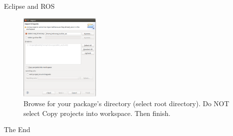\documentclass{beamer}
\begin{document}
\begin{frame}{Eclipse and ROS}

\begin{figure}
	\centering
  \includegraphics[width=0.35\textwidth]{./images/file.pdf}
	\caption{Browse for your package's directory (select root directory). Do NOT select Copy projects into workspace. Then finish.}
	\label{fig1}
\end{figure}

\end{frame}
\begin{frame}
\Huge{\centerline{The End}}
\end{frame}
\end{document}
